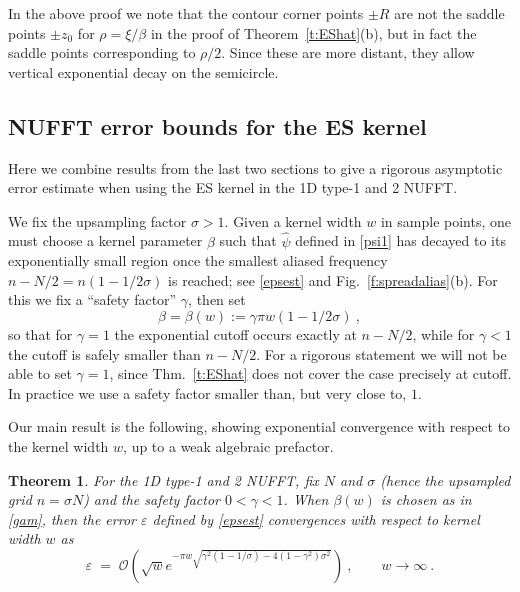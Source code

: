 \documentclass[10pt]{article}
\newcommand{\be}{\begin{equation}}
\newcommand{\ee}{\end{equation}}
\newcommand{\eps}{\varepsilon}
\newcommand{\bigO}{{\mathcal O}}
\newtheorem{thm}{Theorem}
\newtheorem{lem}[thm]{Lemma}
\newcommand{\freq}{\beta}          %
\newcommand{\rat}{\sigma}          %
\begin{document}
In the above proof we note that the contour corner points $\pm R$ are not
the saddle points $\pm z_0$ for $\rho=\xi/\freq$
in the proof of Theorem~\ref{t:EShat}(b),
but in fact the saddle points corresponding to $\rho/2$.
Since these are more distant, they allow vertical exponential
decay on the semicircle.





\subsection{NUFFT error bounds for the ES kernel}
\label{s:ESerr}

Here we combine results from the last two sections to give a rigorous
asymptotic error estimate when using the ES kernel in the 1D
type-1 and 2 NUFFT.

We fix the upsampling factor $\rat>1$.
Given a kernel width $w$ in sample points, one must choose
a kernel parameter $\freq$ such that $\hat\psi$ defined in \eqref{psi1}
has decayed to its
exponentially small region once the smallest aliased
frequency $n-N/2 = n(1-1/2\rat)$ is reached; see \eqref{epsest} and
Fig.~\ref{f:spreadalias}(b).
For this we fix a ``safety factor'' $\gamma$, then set
\be
\freq = \freq(w) := \gamma \pi w (1-1/2\rat)~,
\label{gam}
\ee
so that for $\gamma=1$ the exponential cutoff occurs exactly at $n-N/2$,
while for $\gamma<1$ the cutoff is safely smaller than $n-N/2$.
For a rigorous statement we will not be able to set
$\gamma=1$, since Thm.~\ref{t:EShat}
does not cover the case precisely at cutoff.
In practice we use a safety factor smaller than, but very close to, $1$.

Our main result is the following, showing exponential convergence
with respect to the kernel width $w$, up to a weak algebraic prefactor.
\begin{thm} %
  For the 1D type-1 and 2 NUFFT, fix $N$ and $\rat$ (hence the upsampled grid $n=\sigma N$) and the safety factor $0<\gamma<1$.
  When $\freq(w)$ is chosen as in \eqref{gam},
  then the error $\eps$ defined by \eqref{epsest} convergences with respect to
  kernel width $w$ as
  \be
  \eps \;=\; \bigO\left( \sqrt{w} e^{-\pi w \sqrt{\gamma^2(1-1/\rat) - 4(1-\gamma^2)\rat^2}}
  \right)
  ~, \qquad w\to \infty ~.
  \label{ESerr}
  \ee
  \label{t:ESerr}
\end{thm}  %
\end{document}
